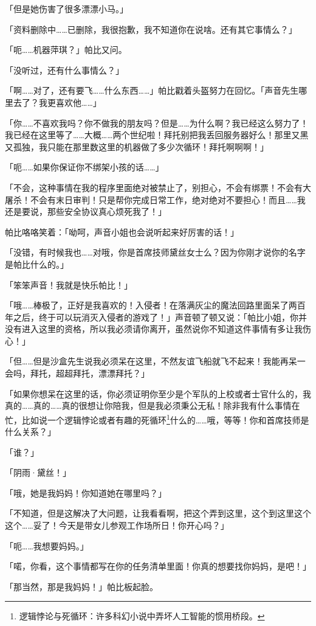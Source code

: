 「但是她伤害了很多漂漂小马。」

「资料删除中……已删除，我很抱歉，我不知道你在说啥。还有其它事情么？」

「呃……机器萍琪？」帕比又问。

「没听过，还有什么事情么？」

「啊……对了，还有要飞……什么东西……」帕比戳着头盔努力在回忆。「声音先生哪里去了？我更喜欢他……」

「你……不喜欢我吗？你不做我的朋友吗？但是……为什么啊？我已经这么努力了！我已经在这里等了……大概……两个世纪啦！拜托别把我丢回服务器好么！那里又黑又孤独，我只能在那里数这里的机器做了多少次循环！拜托啊啊啊！」

「呃……如果你保证你不绑架小孩的话……」

「不会，这种事情在我的程序里面绝对被禁止了，别担心，不会有绑票！不会有大屠杀！不会有末日审判！只是帮你完成日常工作，绝对绝对不要担心！而且……我还是要说，那些安全协议真心烦死我了！」

帕比咯咯笑着：「呦呵，声音小姐也会说听起来好厉害的话！」

「没错，有时候我也……对哦，你是首席技师黛丝女士么？因为你刚才说你的名字是帕比什么的。」

「笨笨声音！我就是快乐帕比！」

「哦……棒极了，正好是我喜欢的！入侵者！在落满灰尘的魔法回路里面呆了两百年之后，终于可以玩消灭入侵者的游戏了！」声音顿了顿又说：「帕比小姐，你并没有进入这里的资格，所以我必须请你离开，虽然说你不知道这件事情有多让我伤心！」

「但……但是沙盒先生说我必须呆在这里，不然友谊飞船就飞不起来！我能再呆一会吗，拜托，超超拜托，漂漂拜托？」

「如果你想呆在这里的话，你必须证明你至少是个军队的上校或者士官什么的，我真的……真的……真的很想让你陪我，但是我必须秉公无私！除非我有什么事情在忙，比如说一个逻辑悖论或者有趣的死循环\footnote{逻辑悖论与死循环：许多科幻小说中弄坏人工智能的惯用桥段。}什么的……哦，等等！你和首席技师是什么关系？」

「谁？」

「阴雨·黛丝！」

「哦，她是我妈妈！你知道她在哪里吗？」

「不知道，但是这解决了大问题，让我看看啊，把这个弄到这里，这个到这里这个这个……妥了！今天是带女儿参观工作场所日！你开心吗？」

「呃……我想要妈妈。」

「喏，你看，这个事情都写在你的任务清单里面！你真的想要找你妈妈，是吧！」

「那当然，那是我妈妈！」帕比板起脸。

